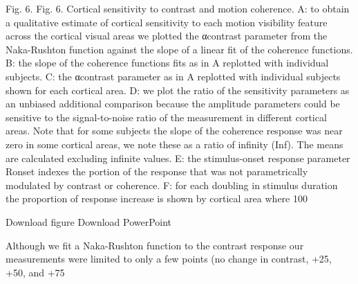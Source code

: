 \documentclass{report}
\begin{document}
Fig. 6.
Fig. 6.
Cortical sensitivity to contrast and motion coherence. A: to obtain a qualitative estimate of cortical sensitivity to each motion visibility feature across the cortical visual areas we plotted the αcontrast parameter from the Naka-Rushton function against the slope of a linear fit of the coherence functions. B: the slope of the coherence functions fits as in A replotted with individual subjects. C: the αcontrast parameter as in A replotted with individual subjects shown for each cortical area. D: we plot the ratio of the sensitivity parameters as an unbiased additional comparison because the amplitude parameters could be sensitive to the signal-to-noise ratio of the measurement in different cortical areas. Note that for some subjects the slope of the coherence response was near zero in some cortical areas, we note these as a ratio of infinity (Inf). The means are calculated excluding infinite values. E: the stimulus-onset response parameter Ronset indexes the portion of the response that was not parametrically modulated by contrast or coherence. F: for each doubling in stimulus duration the proportion of response increase is shown by cortical area where 100%

Download figure Download PowerPoint

Although we fit a Naka-Rushton function to the contrast response our measurements were limited to only a few points (no change in contrast, +25, +50, and +75%
\end{document}

